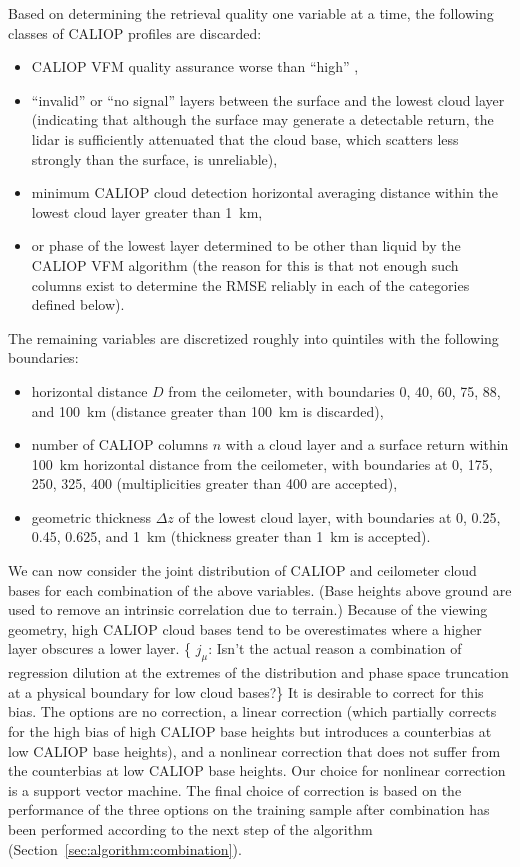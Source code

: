 \documentclass[essd,manuscript]{copernicus}\usepackage[]{graphicx}\usepackage[]{color}
\newcommand{\hlnum}[1]{\textcolor[rgb]{0.686,0.059,0.569}{#1}}%
\newcommand\comment[2]{\{\hlnum{ \textit{#1}: #2}\}}
\newcommand\commentjm[1]{\comment{$j_\mu$}{#1}}
\begin{document}
Based on determining the retrieval quality one variable at a time, the following
classes of CALIOP profiles are discarded:
\begin{itemize}
\item CALIOP VFM quality assurance worse than ``high'' ,
\item ``invalid'' or ``no signal'' layers between the surface and the lowest
  cloud layer (indicating that although the surface may generate a detectable
  return, the lidar is sufficiently attenuated that the cloud base, which
  scatters less strongly than the surface, is unreliable),
\item minimum CALIOP cloud detection horizontal averaging distance within the
  lowest cloud layer greater than 1~km,
\item or phase of the lowest layer determined to be other than liquid by the
  CALIOP VFM algorithm (the reason for this is that not enough such columns
  exist to determine the RMSE reliably in each of the categories defined below).
\end{itemize}

The remaining variables are discretized roughly into quintiles with the
following boundaries:
\begin{itemize}
\item horizontal distance $D$ from the ceilometer, with boundaries 0, 40, 60,
  75, 88, and 100~km (distance greater than 100~km is discarded),
\item number of CALIOP columns $n$ with a cloud layer and a surface return
  within 100~km horizontal distance from the ceilometer, with boundaries at 0,
  175, 250, 325, 400 (multiplicities greater than 400 are accepted),
\item geometric thickness $\Delta z$ of the lowest cloud layer, with boundaries
  at 0, 0.25, 0.45, 0.625, and 1~km (thickness greater than 1~km is accepted).
\end{itemize}

We can now consider the joint distribution of CALIOP and ceilometer cloud bases
for each combination of the above variables.  (Base heights above ground are
used to remove an intrinsic correlation due to terrain.)  Because of the viewing
geometry, high CALIOP cloud bases tend to be overestimates where a higher layer
obscures a lower layer.  \commentjm{Isn't the actual reason a combination of
  regression dilution at the extremes of the distribution and phase space
  truncation at a physical boundary for low cloud bases?}  It is desirable to
correct for this bias.  The options are no correction, a linear correction
(which partially corrects for the high bias of high CALIOP base heights but
introduces a counterbias at low CALIOP base heights), and a nonlinear correction
that does not suffer from the counterbias at low CALIOP base heights.  Our
choice for nonlinear correction is a support vector machine.  The final choice
of correction is based on the performance of the three options on the training
sample after combination has been performed according to the next step of the
algorithm (Section~\ref{sec:algorithm:combination}).
\end{document}

